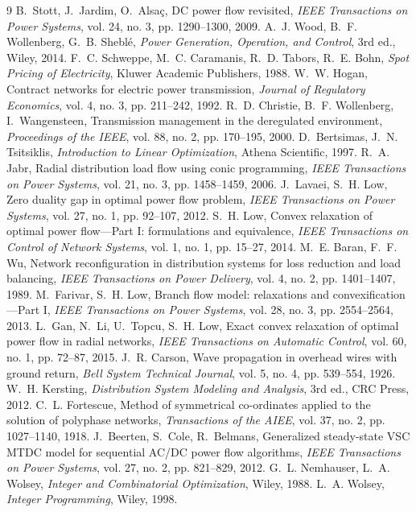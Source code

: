{\renewcommand{\section}[2]{}%
\begin{thebibliography}{9}\small
{} B.~Stott, J.~Jardim, O.~Alsa\c{c}, DC
power flow revisited, \emph{IEEE Transactions on Power Systems}, vol. 24,
no. 3, pp. 1290--1300, 2009.
 A.~J. Wood, B.~F. Wollenberg, G.~B. Shebl\'e,
\emph{Power Generation, Operation, and Control}, 3rd ed., Wiley, 2014.
 F.~C. Schweppe, M.~C. Caramanis, R.~D. Tabors,
R.~E. Bohn, \emph{Spot Pricing of Electricity}, Kluwer Academic Publishers,
1988.
 W.~W. Hogan, Contract networks for electric power
transmission, \emph{Journal of Regulatory Economics}, vol. 4, no. 3,
pp. 211--242, 1992.
 R.~D. Christie, B.~F. Wollenberg, I.~Wangensteen,
Transmission management in the deregulated environment, \emph{Proceedings of
the IEEE}, vol. 88, no. 2, pp. 170--195, 2000.
 D.~Bertsimas, J.~N. Tsitsiklis, \emph{Introduction
to Linear Optimization}, Athena Scientific, 1997.
 R.~A. Jabr, Radial distribution load flow using conic
programming, \emph{IEEE Transactions on Power Systems}, vol. 21, no. 3,
pp. 1458--1459, 2006.
 J.~Lavaei, S.~H. Low, Zero duality gap in optimal
power flow problem, \emph{IEEE Transactions on Power Systems}, vol. 27,
no. 1, pp. 92--107, 2012.
 S.~H. Low, Convex relaxation of optimal power
flow---Part I: formulations and equivalence, \emph{IEEE Transactions on
Control of Network Systems}, vol. 1, no. 1, pp. 15--27, 2014.
 M.~E. Baran, F.~F. Wu, Network reconfiguration in
distribution systems for loss reduction and load balancing, \emph{IEEE
Transactions on Power Delivery}, vol. 4, no. 2, pp. 1401--1407, 1989.
 M.~Farivar, S.~H. Low, Branch flow model:
relaxations and convexification---Part I, \emph{IEEE Transactions on Power
Systems}, vol. 28, no. 3, pp. 2554--2564, 2013.
 L.~Gan, N.~Li, U.~Topcu, S.~H. Low, Exact convex
relaxation of optimal power flow in radial networks, \emph{IEEE Transactions
on Automatic Control}, vol. 60, no. 1, pp. 72--87, 2015.
 J.~R. Carson, Wave propagation in overhead wires with
ground return, \emph{Bell System Technical Journal}, vol. 5, no. 4,
pp. 539--554, 1926.
 W.~H. Kersting, \emph{Distribution System Modeling
and Analysis}, 3rd ed., CRC Press, 2012.
 C.~L. Fortescue, Method of symmetrical co-ordinates
applied to the solution of polyphase networks, \emph{Transactions of the
AIEE}, vol. 37, no. 2, pp. 1027--1140, 1918.
 J.~Beerten, S.~Cole, R.~Belmans, Generalized
steady-state VSC MTDC model for sequential AC/DC power flow algorithms,
\emph{IEEE Transactions on Power Systems}, vol. 27, no. 2, pp. 821--829,
2012.
 G.~L. Nemhauser, L.~A. Wolsey,
\emph{Integer and Combinatorial Optimization}, Wiley, 1988.
 L.~A. Wolsey, \emph{Integer Programming}, Wiley, 1998.
\end{thebibliography}}
